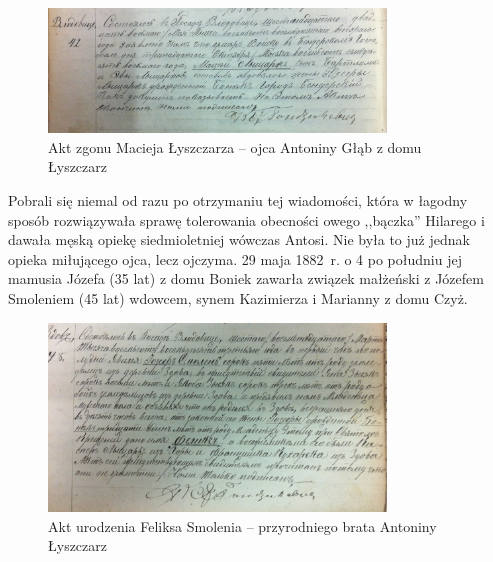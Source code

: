 \begin{figure}[!h]
\begin{center}
\includegraphics[width=0.8\textwidth]{zdjecia/akt_zgonu_macieja_lyszczarza.jpg}
\caption[Akt zgonu Macieja Łyszczarza]{Akt zgonu Macieja Łyszczarza -- ojca Antoniny Głąb z domu Łyszczarz}
\label{rys:akt_zgonu_macieja_lyszczarza.jpg}
\end{center}
\end{figure}

Pobrali się niemal od razu po otrzymaniu tej wiadomości, która w łagodny sposób rozwiązywała sprawę tolerowania obecności owego ,,bączka'' Hilarego i dawała męską opiekę siedmioletniej wówczas Antosi. Nie była to już jednak opieka miłującego ojca, lecz ojczyma. 29 maja 1882~r. o 4 po południu jej mamusia Józefa (35 lat) z domu Boniek zawarła związek małżeński z Józefem Smoleniem (45 lat) wdowcem, synem Kazimierza i Marianny z domu Czyż.

\begin{figure}[!h]
\begin{center}
\includegraphics[width=0.8\textwidth]{zdjecia/akt_urodzenia_feliksa_smolenia.jpg}
\caption[Akt urodzenia Feliksa Smolenia]{Akt urodzenia Feliksa Smolenia -- przyrodniego brata Antoniny  Łyszczarz}
\label{rys:akt_urodzenia_feliksa_smolenia}
\end{center}
\end{figure}

